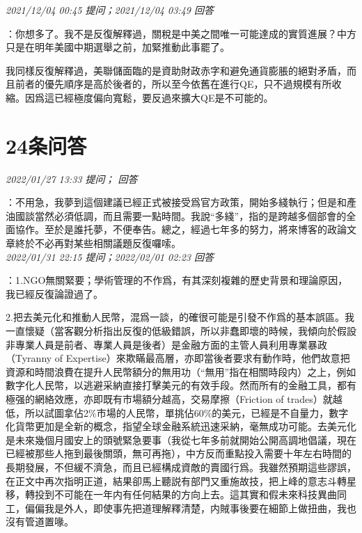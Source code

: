 \documentclass[twocolumn]{ctexart}
\begin{document}
\textit{\hfill\noindent\small 2021/12/04 00:45 提问；2021/12/04 03:49 回答}

：你想多了。我不是反復解釋過，關稅是中美之間唯一可能達成的實質進展？中方只是在明年美國中期選舉之前，加緊推動此事罷了。

我同樣反復解釋過，美聯儲面臨的是資助財政赤字和避免通貨膨脹的絕對矛盾，而且前者的優先順序是高於後者的，所以至今依舊在進行QE，只不過規模有所收縮。因爲這已經極度偏向寬鬆，要反過來擴大QE是不可能的。
\\

\section{24条问答}

\textit{\hfill\noindent\small 2022/01/27 13:33 提问； 回答}

：不用急，我夢到這個建議已經正式被接受爲官方政策，開始多綫執行；但是和產油國談當然必須低調，而且需要一點時間。我說“多綫”，指的是跨越多個部會的全面協作。至於是誰托夢，不便奉告。總之，經過七年多的努力，將來博客的政論文章終於不必再對某些相關議題反復囉嗦。\\

\textit{\hfill\noindent\small 2022/01/31 22:15 提问；2022/02/01 02:23 回答}

：1.NGO無關緊要；學術管理的不作爲，有其深刻複雜的歷史背景和理論原因，我已經反復論證過了。

2.把去美元化和推動人民幣，混爲一談，的確很可能是引發不作爲的基本誤區。我一直懷疑（當客觀分析指出反復的低級錯誤，所以非蠢即壞的時候，我傾向於假設非專業人員是前者、專業人員是後者）是金融方面的主管人員利用專業暴政（Tyranny of Expertise）來欺瞞最高層，亦即當後者要求有動作時，他們故意把資源和時間浪費在提升人民幣額分的無用功（“無用”指在相關時段内）之上，例如數字化人民幣，以逃避采納直接打擊美元的有效手段。然而所有的金融工具，都有極强的網絡效應，亦即既有市場額分越高，交易摩擦（Friction of trades）就越低，所以試圖拿佔2\%市場的人民幣，單挑佔60\%的美元，已經是不自量力，數字化貨幣更加是全新的概念，指望全球金融系統迅速采納，毫無成功可能。去美元化是未來幾個月國安上的頭號緊急要事（我從七年多前就開始公開高調地倡議，現在已經被那些人拖到最後關頭，無可再拖），中方反而重點投入需要十年左右時間的長期發展，不但緩不濟急，而且已經構成資敵的賣國行爲。我雖然預期這些謬誤，在正文中再次指明正道，結果卻馬上聽説有部門又重施故技，把上峰的意志斗轉星移，轉投到不可能在一年内有任何結果的方向上去。這其實和假未來科技異曲同工，偏偏我是外人，即使事先把道理解釋清楚，内賊事後要在細節上做扭曲，我也沒有管道置喙。
\end{document}
